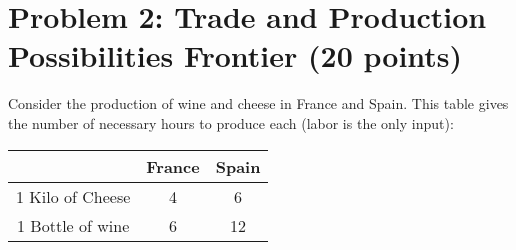 \documentclass{article}
\begin{document}
\section*{Problem 2: Trade and Production Possibilities Frontier (20 points)}
Consider the production of wine and cheese in France and Spain. This table gives the number of necessary hours to produce each (labor is the only input):

\begin{tabular}{c|c|c|}
& France & Spain \\
\hline
1 Kilo of Cheese & 4 & 6 \\
1 Bottle of wine & 6 & 12 \\
\end{tabular}
\end{document}
